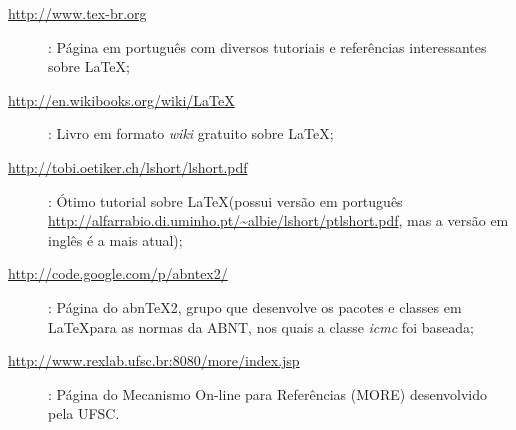 \begin{description}
 \item[\url{http://www.tex-br.org}]: Página em português com diversos tutoriais e referências interessantes sobre \LaTeX;
 \item[\url{http://en.wikibooks.org/wiki/LaTeX}]: Livro em formato \textit{wiki} gratuito sobre \LaTeX;
 \item[\url{http://tobi.oetiker.ch/lshort/lshort.pdf}]: Ótimo tutorial sobre \LaTeX (possui versão em português \url{http://alfarrabio.di.uminho.pt/~albie/lshort/ptlshort.pdf}, mas a versão em inglês é a mais atual);
 \item[\url{http://code.google.com/p/abntex2/}]: Página do abnTeX2, grupo que desenvolve os pacotes e classes em \LaTeX para as normas da ABNT, nos quais a classe \textit{icmc} foi baseada;
\item[\url{ http://www.rexlab.ufsc.br:8080/more/index.jsp}]: Página do Mecanismo On-line para Referências  (MORE) desenvolvido pela UFSC.
 \end{description}